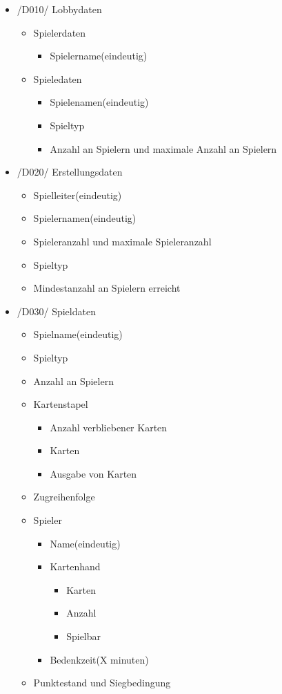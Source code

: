 \documentclass{article}
\begin{document}
\begin{itemize}
	\item /D010/ Lobbydaten
	 \begin{itemize}
	 	\item Spielerdaten
	 	\begin{itemize}
	 		\item Spielername(eindeutig)
	 	\end{itemize}
	 	\item Spieledaten
	 	\begin{itemize}
	 		\item Spielenamen(eindeutig)
	 		\item Spieltyp
	 		\item Anzahl an Spielern und maximale Anzahl an Spielern
	 	\end{itemize}
	 \end{itemize}
	 \item /D020/ Erstellungsdaten
	 \begin{itemize}
	 	\item Spielleiter(eindeutig)
	 	\item Spielernamen(eindeutig)
	 	\item Spieleranzahl und maximale Spieleranzahl
	 	\item Spieltyp
	 	\item Mindestanzahl an Spielern erreicht
	 \end{itemize}
	 \item /D030/ Spieldaten
	 \begin{itemize}
	 	\item Spielname(eindeutig)
	 	\item Spieltyp
	 	\item Anzahl an Spielern
	 	\item Kartenstapel
	 	\begin{itemize}
	 		\item Anzahl verbliebener Karten
	 		\item Karten
	 		\item Ausgabe von Karten
	 	\end{itemize}
	 	\item Zugreihenfolge
	 	\item Spieler
	 	\begin{itemize}
	 		\item Name(eindeutig)
	 		\item Kartenhand
	 		\begin{itemize}
	 			\item Karten
	 			\item Anzahl
	 			\item Spielbar
	 		\end{itemize}	 
	 		\item Bedenkzeit(X minuten)		
	 	\end{itemize}
	 	\item Punktestand und Siegbedingung
	 \end{itemize}
\end{itemize}
\end{document}
